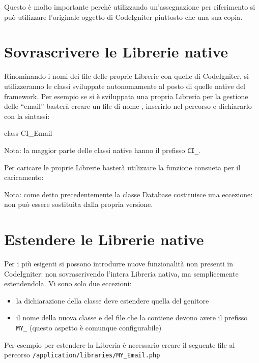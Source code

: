 Questo è molto importante perché utilizzando un'assegnazione per riferimento si può utilizzare l'originale oggetto di CodeIgniter piuttosto che una sua copia.

\section*{Sovrascrivere le Librerie native}
Rinominando i nomi dei file delle proprie Librerie con quelle di CodeIgniter, si utilizzeranno le classi sviluppate autonomamente al posto di quelle native del framework. Per esempio se si è sviluppata una propria Libreria per la gestione delle ``email'' basterà creare un file di nome , inserirlo nel percorso  e dichiararlo con la sintassi:

\begin{code}
class CI_Email {

}
\end{code}

Nota: la maggior parte delle classi native hanno il prefisso \verb|CI_|.

Per caricare le proprie Librerie basterà utilizzare la funzione consueta per il caricamento:


Nota: come detto precedentemente la classe Database costituisce una eccezione: non può essere sostituita dalla propria versione.

\section*{Estendere le Librerie native}
Per i più esigenti si possono introdurre nuove funzionalità non presenti in CodeIgniter: non sovrascrivendo l'intera Libreria nativa, ma semplicemente estendendola. Vi sono solo due eccezioni:

\begin{itemize}
\item la dichiarazione della classe deve estendere quella del genitore
\item  il nome della nuova classe e del file che la contiene devono avere il prefisso \verb|MY_| (questo aspetto è comunque configurabile)
\end{itemize}

Per esempio per estendere la Libreria  è necessario creare il seguente file al percorso \verb|/application/libraries/MY_Email.php|

